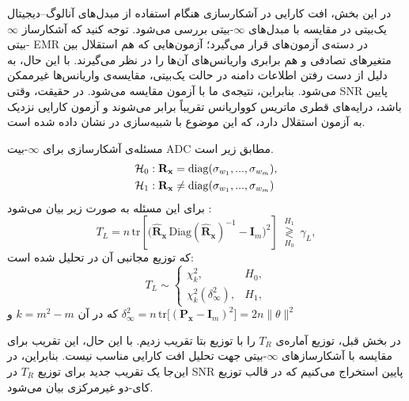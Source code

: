 
در این بخش، افت کارایی در آشکارسازی هنگام استفاده از مبدل‌های آنالوگ–دیجیتال یک‌بیتی 
 در مقایسه با مبدل‌های $\infty$-بیتی بررسی می‌شود.  
توجه کنید که آشکارساز $\infty$-بیتی EMR در دسته‌ی آزمون‌های  قرار می‌گیرد؛ آزمون‌هایی که هم استقلال بین متغیرهای تصادفی و هم برابری واریانس‌های آن‌ها را در نظر می‌گیرند.  
با این حال، به دلیل از دست رفتن اطلاعات دامنه در حالت یک‌بیتی، مقایسه‌ی واریانس‌ها غیرممکن می‌شود.  
بنابراین، نتیجه‌ی ما با آزمون  مقایسه می‌شود.  
در حقیقت، وقتی SNR پایین باشد، درایه‌های قطری ماتریس کوواریانس تقریباً برابر می‌شوند و آزمون  کارایی نزدیک به آزمون استقلال دارد، که این موضوع با شبیه‌سازی در  نشان داده شده است.


مسئله‌ی آشکارسازی برای $\infty$-بیت ADC مطابق زیر است.  
\begin{align}
	\mathcal{H}_0 &: \mathbf{R}_\mathbf{x} = \mathrm{diag}(\sigma_{w_1}, ..., \sigma_{w_m}), \notag \\
	\mathcal{H}_1 &: \mathbf{R}_\mathbf{x} \neq \mathrm{diag}(\sigma_{w_1}, ..., \sigma_{w_m}) \notag
\end{align}
 برای این مسئله به صورت زیر بیان می‌شود :
\begin{equation}
	T_{L}=n\,\mathrm{tr}\!\left[\big(\hat{\mathbf{R}}_{\mathbf{x}}\,\mathrm{Diag}(\hat{\mathbf{R}}_{\mathbf{x}})^{-1}-\mathbf{I}_{m}\big)^{2}\right]
	\;\underset{H_{0}}{\overset{H_{1}}{\gtrless}}\;\gamma_{L},
\end{equation}
که توزیع مجانبی آن در  تحلیل شده است:
\begin{equation}
	T_{L}\sim
	\begin{cases}
		\chi^{2}_{k}, & H_{0},\\[6pt]
		\chi^{2}_{k}(\delta_{\infty}^{2}), & H_{1},
	\end{cases}
\end{equation}
که در آن $k=m^{2}-m$ و
$
	\delta_{\infty}^{2}=n\,\mathrm{tr}\!\big[(\mathbf{P}_{\mathbf{x}}-\mathbf{I}_{m})^{2}\big]=2n\|\theta\|^{2}
$

در بخش قبل، توزیع آماره‌ی $T_{R}$ را با توزیع بتا تقریب زدیم.  
با این حال، این تقریب برای مقایسه با آشکارسازهای $\infty$-بیتی جهت تحلیل افت کارایی مناسب نیست.  
بنابراین، در این‌جا یک تقریب جدید برای توزیع $T_{R}$ در SNR پایین استخراج می‌کنیم که در قالب توزیع کای-دو غیرمرکزی بیان می‌شود.  

